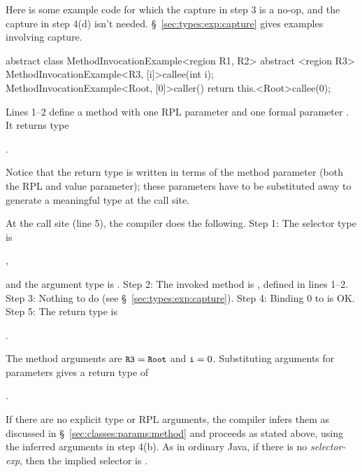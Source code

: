 Here is some example code for which the capture in step 3 is a no-op,
and the capture in step 4(d) isn't needed.
\S~\ref{sec:types:exp:capture} gives examples involving capture.
%
\begin{numbereddpjlisting}
abstract class MethodInvocationExample<region R1, R2> {
    abstract <region R3>
        MethodInvocationExample<R3, [i]>callee(int i);
    MethodInvocationExample<Root, [0]>caller() {
        return this.<Root>callee(0);
    }
}
\end{numbereddpjlisting}
%
Lines 1--2 define a method  with one RPL parameter
 and one formal parameter .  It returns type
%
\begin{description}
\item {}.  
\end{description}
%
Notice that the return type is written in terms of the method
parameter (both the RPL and value parameter); these parameters have to
be substituted away to generate a meaningful type at the call site.

At the call site (line 5), the compiler does the following.  Step 1:
The selector type is 
%
\begin{description}
\item {},
\end{description}
%
and the argument type is .  Step 2: The invoked method is
, defined in lines 1--2.  Step 3: Nothing to do (see
\S~\ref{sec:types:exp:capture}).  Step 4: Binding 0 to  is
OK.  Step 5: The return type is
%
\begin{description}
\item {}.
\end{description}
%
The method arguments are $\mbox{\small{\texttt{R3}}}=\mbox{\small{\texttt{Root}}}$ and $\mbox{\small{\texttt{i}}}=0$.
Substituting arguments for parameters gives a return type of
%
\begin{description}
\item {}.
\end{description}

 If there are no explicit
type or RPL arguments, the compiler infers them as discussed in
\S~\ref{sec:classes:params:method} and proceeds as stated above, using
the inferred arguments in step 4(b).  As in ordinary Java, if there is
no \emph{selector-exp}, then the implied selector is .

